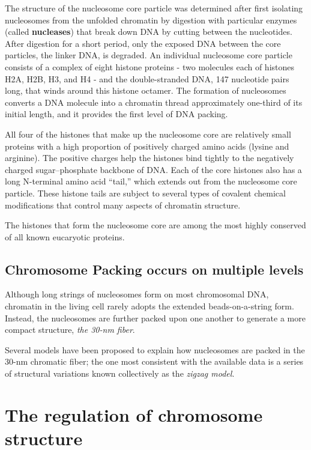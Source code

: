 The structure of the nucleosome core particle was determined after first
isolating nucleosomes from the unfolded chromatin by digestion with
particular enzymes (called \textbf{nucleases}) that break down DNA by cutting
between the nucleotides. After digestion for a short period, only the
exposed DNA between the core particles, the linker DNA, is degraded.
An individual nucleosome core particle consists of a complex of eight
histone proteins - two molecules each of histones H2A, H2B, H3, and
H4 - and the double-stranded DNA, 147 nucleotide pairs long, that winds
around this histone octamer.
The formation of nucleosomes converts a DNA molecule
into a chromatin thread approximately one-third of its initial length, and
it provides the first level of DNA packing.

All four of the histones that make up the nucleosome core are relatively
small proteins with a high proportion of positively charged amino acids
(lysine and arginine). The positive charges help the histones bind tightly
to the negatively charged sugar–phosphate backbone of DNA.
Each of the core histones also has a long
N-terminal amino acid “tail,” which extends out from the nucleosome
core particle. These histone tails are subject to several
types of covalent chemical modifications that control many aspects of
chromatin structure.

The histones that form the nucleosome core are among the most highly
conserved of all known eucaryotic proteins.

\subsection{Chromosome Packing occurs on multiple levels}

Although long strings of nucleosomes form on most chromosomal DNA,
chromatin in the living cell rarely adopts the extended beads-on-a-string
form. Instead, the nucleosomes are further packed
upon one another to generate a more compact structure, \textit{the 30-nm
fiber}.

Several models have been proposed to explain how nucleosomes are packed in the 30-nm
chromatic fiber; the one most consistent with the available data is a series of structural
variations known collectively as the \textit{zigzag model}.

\section{The regulation of chromosome structure}

